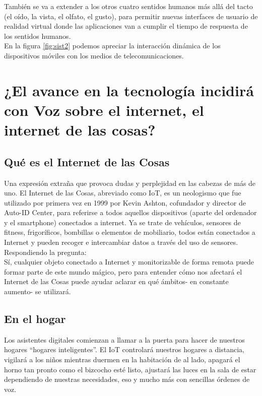 \documentclass[]{article}
\begin{document}
 También se va
a extender a los otros cuatro
sentidos humanos más allá del
tacto (el oído, la vista, el olfato, el
gusto), para permitir nuevas
interfaces de usuario de realidad
virtual donde las aplicaciones van
a cumplir el tiempo de respuesta
de los sentidos humanos.\\

En la figura \ref{fig:sist2} podemos apreciar la interacción dinámica de los dispositivos móviles con los medios de telecomunicaciones.\\

\section{¿El avance en la tecnología incidirá con Voz sobre el internet, el internet de las cosas?}


\subsection{Qué es el Internet de las Cosas}

Una expresión extraña que provoca dudas y perplejidad en las cabezas de más de uno. El Internet de las Cosas, abreviado como IoT, es un neologismo que fue utilizado por primera vez en 1999 por Kevin Ashton, cofundador y director de Auto-ID Center, para referirse a todos aquellos dispositivos (aparte del ordenador y el smartphone) conectados a internet. Ya se trate de vehículos, sensores de fitness, frigoríficos, bombillas o elementos de mobiliario, todos están conectados a Internet y pueden recoger e intercambiar datos a través del uso de sensores.\\

Respondiendo la pregunta:\\

Sí, cualquier objeto conectado a Internet y monitorizable de forma remota puede formar parte de este mundo mágico, pero para entender cómo nos afectará el Internet de las Cosas puede ayudar aclarar en qué ámbitos- en constante aumento- se utilizará.\\

\subsection{En el hogar}

Los asistentes digitales comienzan a llamar a la puerta para hacer de nuestros hogares “hogares inteligentes”. El IoT controlará nuestros hogares a distancia, vigilará a los niños mientras duermen en la habitación de al lado, apagará el horno tan pronto como el bizcocho esté listo, ajustará las luces en la sala de estar dependiendo de nuestras necesidades, eso  y mucho más con sencillas órdenes de voz.\\
\end{document}
